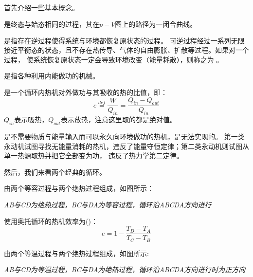 \subsection[热机]{}
首先介绍一些基本概念。
\begin{Itemize}
    \item {} 是终态与始态相同的过程，其在$p-V$图上的路径为一闭合曲线。
    \item {} 是指存在逆过程使得系统与环境都恢复原状态的过程。
    可逆过程经过一系列无限接近平衡态的状态，且不存在热传导、气体的自由膨胀、扩散等过程。如果对一个过程，
    使系统恢复原状态一定会导致环境改变（能量耗散），则称之为 。
    \item {} 是指各种利用内能做功的机械。
\end{Itemize}
\begin{Itemize}
    \item {} 是一个循环内热机对外做功与其吸收的热的比值，即：
    \begin{equation}
        e \overset{def}{=} \frac{W}{Q_{in}} = \frac{Q_{in}-Q_{out}}{Q_{in}}
        \nonumber
    \end{equation}
    $Q_{in}$表示吸热，$Q_{out}$表示放热，注意这里取的都是绝对值。
    \item {} 是不需要物质与能量输入而可以永久向环境做功的热机，是无法实现的。
    第一类永动机试图寻找无能量消耗的热机，违反了能量守恒定律；第二类永动机则试图从单一热源取热并把它全部变为功，
    违反了热力学第二定律。
\end{Itemize}

然后，我们来看两个经典的循环。

 由两个等容过程与两个绝热过程组成，如图所示：
\vspace{1ex}
\begin{center}
    \em AB与CD为绝热过程，BC与DA为等容过程，循环沿ABCDA方向进行
\end{center}

使用奥托循环的热机效率为()：
\begin{equation}
    e = 1 - \frac{T_{D} - T_{A}}{T_{C} - T_{B}}
    \nonumber
\end{equation}

 由两个等温过程与两个绝热过程组成，如图所示:
\vspace{1ex}
\begin{center}
    \em AB与CD为等温过程，BC与DA为绝热过程，循环沿ABCDA方向进行时为正方向
\end{center}


